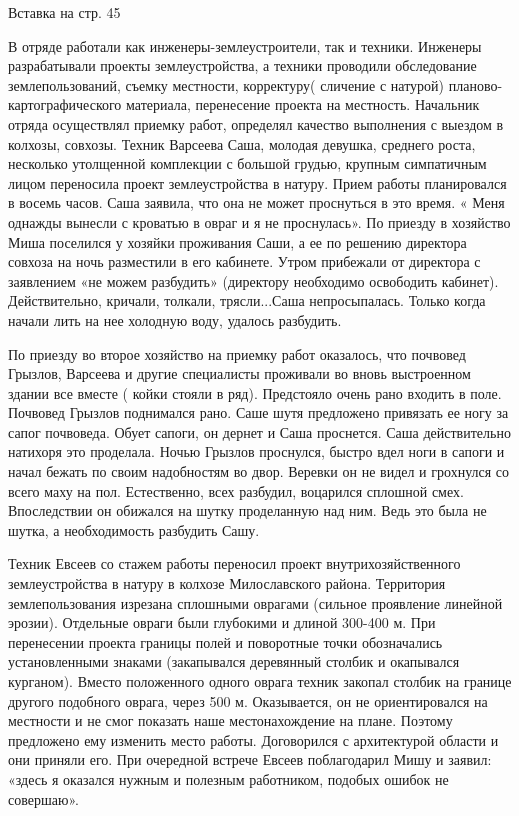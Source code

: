 Вставка на стр. 45

В отряде работали как инженеры-землеустроители, так и техники. Инженеры разрабатывали проекты землеустройства, а техники проводили обследование землепользований, съемку местности, корректуру( сличение с натурой) планово-картографического материала, перенесение проекта на местность. Начальник отряда осуществлял приемку работ, определял качество выполнения с выездом в колхозы, совхозы. Техник Варсеева Саша, молодая девушка, среднего роста, несколько утолщенной комплекции с большой грудью, крупным симпатичным лицом переносила проект землеустройства в натуру. Прием работы планировался в восемь часов. Саша заявила, что она не может проснуться в это время. « Меня однажды вынесли с кроватью в овраг и я не проснулась». По приезду в хозяйство Миша поселился у хозяйки проживания Саши, а ее по решению директора совхоза на ночь разместили в его кабинете. Утром прибежали от директора с заявлением «не можем разбудить» (директору необходимо освободить кабинет). Действительно, кричали, толкали, трясли...Саша непросыпалась. Только когда начали лить на нее холодную воду, удалось разбудить.

По приезду во второе хозяйство на приемку работ оказалось, что почвовед Грызлов, Варсеева и другие специалисты проживали во вновь выстроенном здании все вместе ( койки стояли в ряд). Предстояло очень рано входить в поле. Почвовед Грызлов поднимался рано. Саше шутя предложено привязать ее ногу за сапог почвоведа. Обует сапоги, он дернет и Саша проснется. Саша действительно натихоря это проделала. Ночью Грызлов проснулся, быстро вдел ноги в сапоги и начал бежать по своим надобностям во двор. Веревки он не видел и грохнулся со всего маху на пол. Естественно, всех разбудил, воцарился сплошной смех. Впоследствии он обижался на шутку проделанную над ним. Ведь это была не шутка, а необходимость разбудить Сашу.

Техник Евсеев со стажем работы переносил проект внутрихозяйственного землеустройства в натуру в колхозе Милославского района. Территория землепользования изрезана сплошными оврагами (сильное проявление линейной эрозии). Отдельные овраги были глубокими и длиной 300-400 м. При перенесении проекта границы полей и поворотные точки обозначались установленными знаками (закапывался деревянный столбик и окапывался курганом). Вместо положенного одного оврага техник закопал столбик на границе другого подобного оврага, через 500 м. Оказывается, он не ориентировался на местности и не смог показать наше местонахождение на плане. Поэтому предложено ему изменить место работы. Договорился с архитектурой области и они приняли его. При очередной встрече Евсеев поблагодарил Мишу и заявил: «здесь я оказался нужным и полезным работником, подобых ошибок не совершаю».

